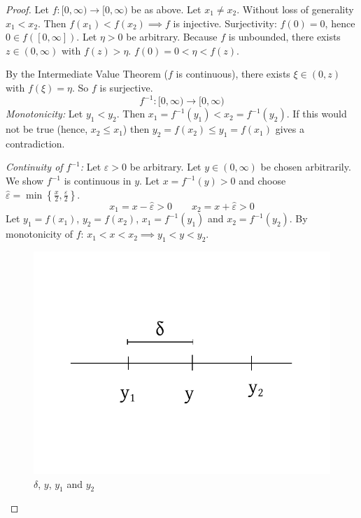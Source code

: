 \documentclass{article}
\newcommand{\set}[1]{\left\{#1\right\}}
\begin{document}
\begin{proof}
  Let $f:[0,\infty) \to [0,\infty)$ be as above.
  Let $x_1 \neq x_2$. Without loss of generality $x_1 < x_2$.
  Then $f(x_1) < f(x_2) \implies f$ is injective.
  Surjectivity: $f(0) = 0$, hence $0 \in f([0,\infty])$.
  Let $\eta > 0$ be arbitrary. Because $f$ is unbounded, there exists $z \in (0,\infty)$ with $f(z) > \eta$.
  $f(0) = 0 < \eta < f(z)$.

  By the Intermediate Value Theorem ($f$ is continuous), there exists $\xi \in (0,z)$ with $f(\xi) = \eta$.
  So $f$ is surjective.
  \[ f^{-1}: [0,\infty) \to [0,\infty) \]
  \emph{Monotonicity:} Let $y_1 < y_2$. Then $x_1 = f^{-1}(y_1) < x_2 = f^{-1}(y_2)$.
  If this would not be true (hence, $x_2 \leq x_1$) then $y_2 = f(x_2) \leq y_1 = f(x_1)$ gives a contradiction.

  \emph{Continuity of $f^{-1}$:}
  Let $\varepsilon > 0$ be arbitrary. Let $y \in (0,\infty)$ be chosen arbitrarily.
  We show $f^{-1}$ is continuous in $y$.
  Let $x = f^{-1}(y) > 0$ and choose $\hat\varepsilon = \min\set{\frac{x}2, \frac{\varepsilon}2}$.
  \[ x_1 = x - \hat\varepsilon > 0 \qquad x_2 = x + \hat \varepsilon > 0 \]
  Let $y_1 = f(x_1)$, $y_2 = f(x_2)$, $x_1 = f^{-1}(y_1)$ and $x_2 = f^{-1}(y_2)$.
  By monotonicity of $f$: $x_1 < x < x_2 \implies y_1 < y < y_2$.

  \begin{figure}[t]
    \begin{center}
      \includegraphics{img/24_setup_delta.pdf}
      \caption{$\delta$, $y$, $y_1$ and $y_2$}
      \label{img:dyyy}
    \end{center}
  \end{figure}


\end{proof}
\end{document}
